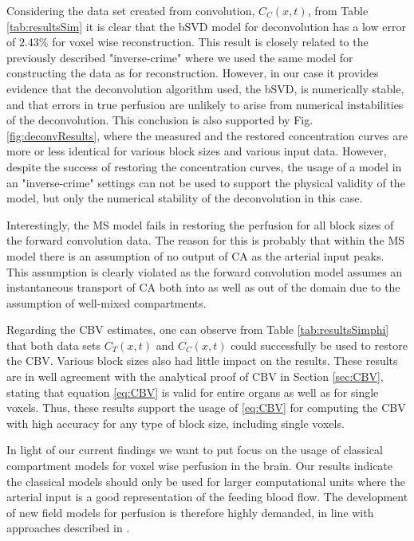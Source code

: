 \documentclass[paper=a4, fontsize=11pt,parskip=half,headings=small]{scrartcl}
\begin{document}
Considering the data set created from convolution, $C_C(x,t)$, from Table \ref{tab:resultsSim} it is clear that the bSVD model for deconvolution has a low error of $2.43 \%$ for voxel wise reconstruction. This result is closely related to the previously described "inverse-crime" where we used the same model for constructing the data as for reconstruction. However, in our case it provides evidence that the deconvolution algorithm used, the bSVD, is numerically stable, and that errors in true perfusion are unlikely to arise from numerical instabilities of the deconvolution. This conclusion is also supported by Fig. \ref{fig:deconvResults}, where the measured and the restored concentration curves are more or less identical for various block sizes and various input data. However, despite the success of restoring the concentration curves, the usage of a model in an "inverse-crime" settings can not be used to support the physical validity of the model, but only the numerical stability of the deconvolution in this case. 

Interestingly, the MS model fails in restoring the perfusion for all block sizes of the forward convolution data. The reason for this is probably that within the MS model there is an assumption of no output of CA as the arterial input peaks. This assumption is clearly violated as the forward convolution model assumes an instantaneous transport of CA both into as well as out of the domain due to the assumption of well-mixed compartments.
	 
Regarding the CBV estimates, one can observe from Table \ref{tab:resultsSimphi} that both data sets $C_T(x,t)$ and $C_C(x,t)$ could successfully be used to restore the CBV. Various block sizes also had little impact on the results. These results are in well agreement with the analytical proof of CBV in Section \ref{sec:CBV}, stating that equation \eqref{eq:CBV} is valid for entire organs as well as for single voxels. Thus, these results support the usage of \eqref{eq:CBV} for computing the CBV with high accuracy for any type of block size, including single voxels.
	 
	 
In light of our current findings we want to put focus on the usage of classical compartment models for voxel wise perfusion in the brain. Our results indicate the classical models should only be used for larger computational units where the arterial input is a good representation of the feeding blood flow. The development of new field models for perfusion is therefore highly demanded, in line with approaches described in \cite{sourbron14}. 
\end{document}
